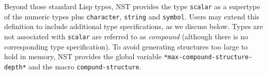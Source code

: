 Beyond those standard Lisp types, NST provides the type
\texttt{scalar} as a supertype of the numeric types plus
\texttt{character}, \texttt{string} and \texttt{symbol}.  Users may
extend this definition to include additional type specifications, as
we discuss below.  Types are not associated with \texttt{scalar} are
referred to as \emph{compound} (although there is no corresponding
type specification).  To avoid generating structures too large to hold
in memory, NST provides the global variable
\texttt{*max-compound-structure-depth*}\label{max-compound-structure-depth}
and the macro \texttt{compund-structure}.


\par

